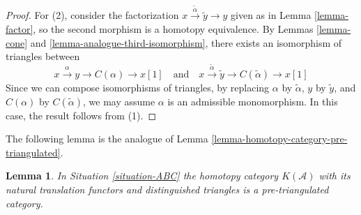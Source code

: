 \documentclass{stacks-project}
\theoremstyle{plain}
\newtheorem{lemma}[subsection]{Lemma}
\theoremstyle{definition}
\theoremstyle{remark}
\numberwithin{equation}{subsection}
\begin{document}
\begin{proof}
\medskip\noindent
For (2), consider the factorization
$x\xrightarrow{\tilde{\alpha}}\tilde{y}\to y$
given as in Lemma \ref{lemma-factor}, so the second morphism
is a homotopy equivalence. By Lemmas \ref{lemma-cone} and
\ref{lemma-analogue-third-isomorphism}, there
exists an isomorphism of triangles between
$$
x \xrightarrow{\alpha} y \to C(\alpha) \to x[1]
\quad\text{and}\quad
x \xrightarrow{\tilde{\alpha}} \tilde{y} \to C(\tilde{\alpha}) \to x[1]
$$
Since we can compose isomorphisms of triangles, by replacing
$\alpha$ by $\tilde{\alpha}$, $y$ by $\tilde{y}$, and $C(\alpha)$ by
$C(\tilde{\alpha})$, we may assume $\alpha$ is an admissible monomorphism.
In this case, the result follows from (1).
\end{proof}

\noindent
The following lemma is the analogue of
Lemma \ref{lemma-homotopy-category-pre-triangulated}.

\begin{lemma}
\label{lemma-analogue-homotopy-category-pre-triangulated}
In Situation \ref{situation-ABC} the homotopy category $K(\mathcal{A})$
with its natural translation functors and distinguished triangles
is a pre-triangulated category.
\end{lemma}
\end{document}
